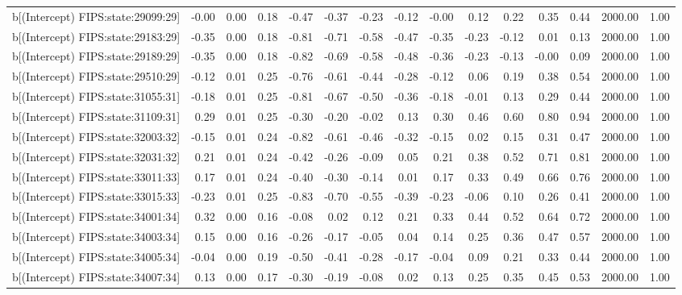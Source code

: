 \begin{table}[ht]
\begin{tabular}{rrrrrrrrrrrrrrr}
  b[(Intercept) FIPS:state:29099:29] & -0.00 & 0.00 & 0.18 & -0.47 & -0.37 & -0.23 & -0.12 & -0.00 & 0.12 & 0.22 & 0.35 & 0.44 & 2000.00 & 1.00 \\ 
  b[(Intercept) FIPS:state:29183:29] & -0.35 & 0.00 & 0.18 & -0.81 & -0.71 & -0.58 & -0.47 & -0.35 & -0.23 & -0.12 & 0.01 & 0.13 & 2000.00 & 1.00 \\ 
  b[(Intercept) FIPS:state:29189:29] & -0.35 & 0.00 & 0.18 & -0.82 & -0.69 & -0.58 & -0.48 & -0.36 & -0.23 & -0.13 & -0.00 & 0.09 & 2000.00 & 1.00 \\ 
  b[(Intercept) FIPS:state:29510:29] & -0.12 & 0.01 & 0.25 & -0.76 & -0.61 & -0.44 & -0.28 & -0.12 & 0.06 & 0.19 & 0.38 & 0.54 & 2000.00 & 1.00 \\ 
  b[(Intercept) FIPS:state:31055:31] & -0.18 & 0.01 & 0.25 & -0.81 & -0.67 & -0.50 & -0.36 & -0.18 & -0.01 & 0.13 & 0.29 & 0.44 & 2000.00 & 1.00 \\ 
  b[(Intercept) FIPS:state:31109:31] & 0.29 & 0.01 & 0.25 & -0.30 & -0.20 & -0.02 & 0.13 & 0.30 & 0.46 & 0.60 & 0.80 & 0.94 & 2000.00 & 1.00 \\ 
  b[(Intercept) FIPS:state:32003:32] & -0.15 & 0.01 & 0.24 & -0.82 & -0.61 & -0.46 & -0.32 & -0.15 & 0.02 & 0.15 & 0.31 & 0.47 & 2000.00 & 1.00 \\ 
  b[(Intercept) FIPS:state:32031:32] & 0.21 & 0.01 & 0.24 & -0.42 & -0.26 & -0.09 & 0.05 & 0.21 & 0.38 & 0.52 & 0.71 & 0.81 & 2000.00 & 1.00 \\ 
  b[(Intercept) FIPS:state:33011:33] & 0.17 & 0.01 & 0.24 & -0.40 & -0.30 & -0.14 & 0.01 & 0.17 & 0.33 & 0.49 & 0.66 & 0.76 & 2000.00 & 1.00 \\ 
  b[(Intercept) FIPS:state:33015:33] & -0.23 & 0.01 & 0.25 & -0.83 & -0.70 & -0.55 & -0.39 & -0.23 & -0.06 & 0.10 & 0.26 & 0.41 & 2000.00 & 1.00 \\ 
  b[(Intercept) FIPS:state:34001:34] & 0.32 & 0.00 & 0.16 & -0.08 & 0.02 & 0.12 & 0.21 & 0.33 & 0.44 & 0.52 & 0.64 & 0.72 & 2000.00 & 1.00 \\ 
  b[(Intercept) FIPS:state:34003:34] & 0.15 & 0.00 & 0.16 & -0.26 & -0.17 & -0.05 & 0.04 & 0.14 & 0.25 & 0.36 & 0.47 & 0.57 & 2000.00 & 1.00 \\ 
  b[(Intercept) FIPS:state:34005:34] & -0.04 & 0.00 & 0.19 & -0.50 & -0.41 & -0.28 & -0.17 & -0.04 & 0.09 & 0.21 & 0.33 & 0.44 & 2000.00 & 1.00 \\ 
  b[(Intercept) FIPS:state:34007:34] & 0.13 & 0.00 & 0.17 & -0.30 & -0.19 & -0.08 & 0.02 & 0.13 & 0.25 & 0.35 & 0.45 & 0.53 & 2000.00 & 1.00 \\ 

\end{tabular}
\end{table}
